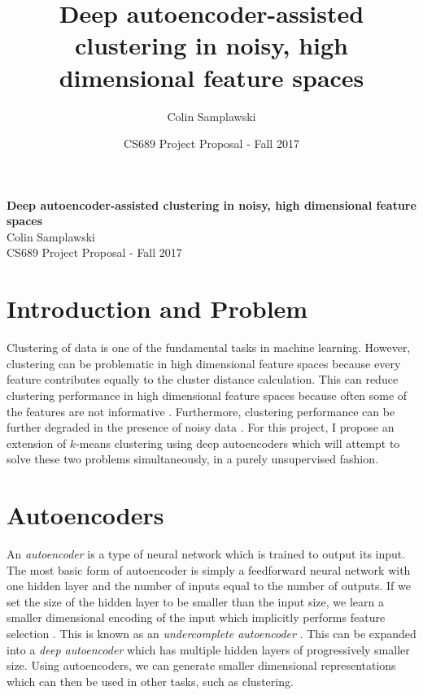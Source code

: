 \documentclass[10pt,twocolumn]{article}
\title{\vspace{-15mm}Deep autoencoder-assisted clustering in noisy, high dimensional feature spaces}
\author{Colin Samplawski}
\date{CS689 Project Proposal - Fall 2017}
\begin{document}
\begin{center}
	{\large \textbf{Deep autoencoder-assisted clustering in noisy, high dimensional feature spaces}}\\
	Colin Samplawski\\
	CS689 Project Proposal - Fall 2017
\end{center}
\section{Introduction and Problem} \vspace{-5mm}
Clustering of data is one of the fundamental tasks in machine learning. However, clustering can be problematic in high dimensional feature spaces because every feature contributes equally to the cluster distance calculation. This can reduce clustering performance in high dimensional feature spaces because often some of the features are not informative \cite{highdimensional}. Furthermore, clustering performance can be further degraded in the presence of noisy data \cite{noisecluster}. For this project, I propose an extension of $k$-means clustering using deep autoencoders which will attempt to solve these two problems simultaneously, in a purely unsupervised fashion.

\vspace{-5mm} \section{Autoencoders} \vspace{-5mm}
An \textit{autoencoder} is a type of neural network which is trained to output its input. The most basic form of autoencoder is simply a feedforward neural network with one hidden layer and the number of inputs equal to the number of outputs. If we set the size of the hidden layer to be smaller than the input size, we learn a smaller dimensional encoding of the input which implicitly performs feature selection \cite{noiseae}. This is known as an \textit{undercomplete autoencoder} \cite{DLBook}. This can be expanded into a \textit{deep autoencoder} which has multiple hidden layers of progressively smaller size. Using autoencoders, we can generate smaller dimensional representations which can then be used in other tasks, such as clustering. 
\end{document}
